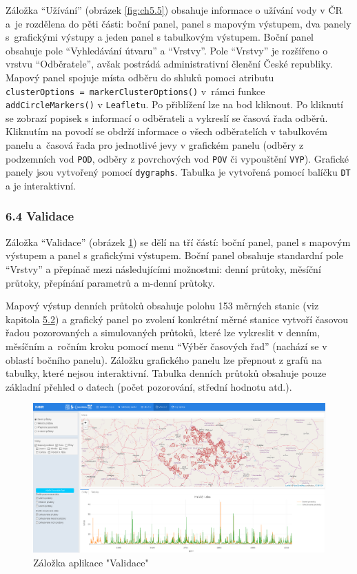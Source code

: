 \documentclass[12pt,]{article}
\begin{document}
\qquad Záložka \enquote{Užívání} (obrázek \ref{fig:ch5.5}) obsahuje
informace o užívání vody v ČR a~je rozdělena do pěti části: boční panel,
panel s mapovým výstupem, dva panely s~grafickými výstupy a jeden panel
s tabulkovým výstupem. Boční panel obsahuje pole \enquote{Vyhledávání
útvaru} a \enquote{Vrstvy}. Pole \enquote{Vrstvy} je rozšířeno o vrstvu
\enquote{Odběratele}, avšak postrádá administrativní členění České
republiky. Mapový panel spojuje místa odběru do shluků pomoci atributu
\texttt{clusterOptions\ =\ markerClusterOptions()} v~rámci funkce
\texttt{addCircleMarkers()} v \texttt{Leaflet}u. Po přiblížení lze na
bod kliknout. Po kliknutí se zobrazí popisek s informací o odběrateli a
vykreslí se časová řada odběrů. Kliknutím na povodí se obdrží informace
o všech odběratelích v tabulkovém panelu a~časová řada pro jednotlivé
jevy v grafickém panelu (odběry z podzemních vod \texttt{POD}, odběry z
povrchových vod \texttt{POV} či vypouštění \texttt{VYP}). Grafické
panely jsou vytvořený pomocí \texttt{dygraphs}. Tabulka je vytvořená
pomocí balíčku \texttt{DT} a je interaktivní.

\subsubsection{6.4 Validace}\label{validace}

\qquad Záložka \enquote{Validace} (obrázek \ref{fig:ch5.6}) se dělí na
tří částí: boční panel, panel s mapovým výstupem a panel s grafickými
výstupem. Boční panel obsahuje standardní pole \enquote{Vrstvy} a
přepínač mezi následujícími možnostmi: denní průtoky, měsíční průtoky,
přepínání parametrů a m-denní průtoky.

\qquad Mapový výstup denních průtoků obsahuje polohu 153 měrných stanic
(viz kapitola \protect\hyperlink{data}{5.2}) a grafický panel po zvolení
konkrétní měrné stanice vytvoří časovou řadou pozorovaných a
simulovaných průtoků, které lze vykreslit v denním, měsíčním a~ročním
kroku pomocí menu \enquote{Výběr časových řad} (nachází se v oblastí
bočního panelu). Záložku grafického panelu lze přepnout z grafů na
tabulky, které nejsou interaktivní. Tabulka denních průtoků obsahuje
pouze základní přehled o datech (počet pozorování, střední hodnotu
atd.).

\begin{figure}[H]
      \includegraphics[width=\textwidth]{fig/P_validace}
      \caption{Záložka aplikace "Validace"}
      \label{fig:ch5.6}
\end{figure}
\end{document}
